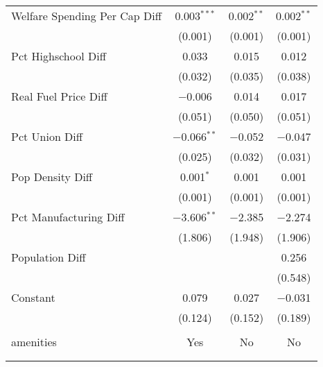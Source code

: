 \begin{table}[!htbp]
\begin{tabular}{@{\extracolsep{5pt}}lccc}
  Welfare Spending Per Cap Diff & 0.003$^{***}$ & 0.002$^{**}$ & 0.002$^{**}$ \\ 
  & (0.001) & (0.001) & (0.001) \\ 
  Pct Highschool Diff & 0.033 & 0.015 & 0.012 \\ 
  & (0.032) & (0.035) & (0.038) \\ 
  Real Fuel Price Diff & $-$0.006 & 0.014 & 0.017 \\ 
  & (0.051) & (0.050) & (0.051) \\ 
  Pct Union Diff & $-$0.066$^{**}$ & $-$0.052 & $-$0.047 \\ 
  & (0.025) & (0.032) & (0.031) \\ 
  Pop Density Diff & 0.001$^{*}$ & 0.001 & 0.001 \\ 
  & (0.001) & (0.001) & (0.001) \\ 
  Pct Manufacturing Diff & $-$3.606$^{**}$ & $-$2.385 & $-$2.274 \\ 
  & (1.806) & (1.948) & (1.906) \\ 
  Population Diff &  &  & 0.256 \\ 
  &  &  & (0.548) \\ 
  Constant & 0.079 & 0.027 & $-$0.031 \\ 
  & (0.124) & (0.152) & (0.189) \\ 
 \hline \\[-1.8ex] 
amenities & Yes & No & No \\ 
\hline \\[-1.8ex] 
\hline 
\hline \\[-1.8ex] 
\end{tabular} 
\end{table} 
